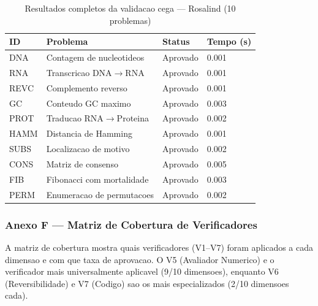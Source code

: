 \begin{table}[H]\centering\footnotesize
\caption{Resultados completos da validacao cega --- Rosalind (10 problemas)}
\label{tab:blind-rosalind}
\begin{tabular}{p{}p{}p{}p{}}
\toprule
\textbf{ID} & \textbf{Problema} & \textbf{Status} & \textbf{Tempo (s)} \\
\midrule
DNA & Contagem de nucleotideos & Aprovado & 0.001 \\
RNA & Transcricao DNA$\to$RNA & Aprovado & 0.001 \\
REVC & Complemento reverso & Aprovado & 0.001 \\
GC & Conteudo GC maximo & Aprovado & 0.003 \\
PROT & Traducao RNA$\to$Proteina & Aprovado & 0.002 \\
HAMM & Distancia de Hamming & Aprovado & 0.001 \\
SUBS & Localizacao de motivo & Aprovado & 0.002 \\
CONS & Matriz de consenso & Aprovado & 0.005 \\
FIB & Fibonacci com mortalidade & Aprovado & 0.003 \\
PERM & Enumeracao de permutacoes & Aprovado & 0.002 \\
\bottomrule
\end{tabular}
\end{table}

\subsubsection{Anexo F --- Matriz de Cobertura de Verificadores}

A matriz de cobertura mostra quais verificadores (V1--V7) foram aplicados
a cada dimensao e com que taxa de aprovacao. O V5 (Avaliador Numerico) e
o verificador mais universalmente aplicavel (9/10 dimensoes), enquanto
V6 (Reversibilidade) e V7 (Codigo) sao os mais especializados (2/10
dimensoes cada).

